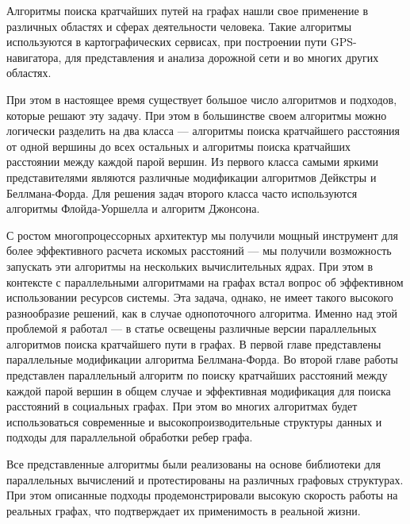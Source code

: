 \startprefacepage

Алгоритмы поиска кратчайших путей на графах нашли свое применение в различных областях и сферах деятельности человека. Такие алгоритмы используются в картографических сервисах, при построении пути GPS-навигатора, для представления и анализа дорожной сети и во многих других областях.
 
При этом в настоящее время существует большое число алгоритмов и подходов, которые решают эту задачу. При этом в большинстве своем алгоритмы можно логически разделить на два класса --- алгоритмы поиска кратчайшего расстояния от одной вершины до всех остальных и алгоритмы поиска кратчайших расстоянии между каждой парой вершин. Из первого класса самыми яркими представителями являются различные модификации алгоритмов Дейкстры и Беллмана-Форда. Для решения задач второго класса часто используются алгоритмы Флойда-Уоршелла и алгоритм Джонсона. 

С ростом многопроцессорных архитектур мы получили мощный инструмент для более эффективного расчета искомых расстояний --- мы получили возможность запускать эти алгоритмы на нескольких вычислительных ядрах. При этом в контексте с параллельными алгоритмами на графах встал вопрос об эффективном использовании ресурсов системы. Эта задача, однако, не имеет такого высокого разнообразие решений, как в случае однопоточного алгоритма. Именно над этой проблемой я работал --- в статье освещены различные версии параллельных алгоритмов поиска кратчайшего пути в графах. В первой главе представлены параллельные модификации алгоритма Беллмана-Форда. Во второй главе работы представлен параллельный алгоритм по поиску кратчайших расстояний между каждой парой вершин в общем случае и эффективная модификация для поиска расстояний в социальных графах. При этом во многих алгоритмах будет использоваться современные и высокопроизводительные структуры данных и подходы для параллельной обработки ребер графа.

Все представленные алгоритмы были реализованы на основе библиотеки для параллельных вычислений и протестированы на различных графовых структурах. При этом описанные подходы продемонстрировали высокую скорость работы на реальных графах, что подтверждает их применимость в реальной жизни.
\FloatBarrier
